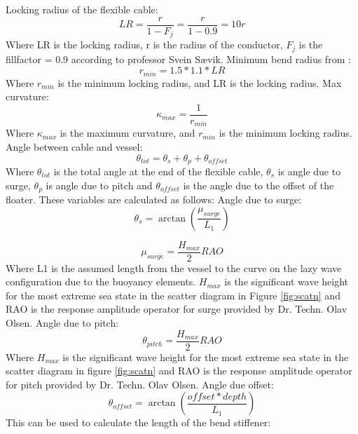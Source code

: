 \noindent Locking radius of the flexible cable:
\begin{equation}
    LR = \frac{r}{1-F_j} = \frac{r}{1-0.9} = 10r
\end{equation}
Where LR is the locking radius, r is the radius of the conductor, $F_j$ is the fillfactor = 0.9 according to professor Svein Sævik. \newline
\newline
Minimum bend radius from \cite{API2014}:
\begin{equation}
   r_{min}= 1.5 * 1.1 * LR
\end{equation}
Where $r_{min}$ is the minimum locking radius, and LR is the locking radius. 
\newline
\newline
Max curvature:
\begin{equation}
   \kappa_{max}= \frac{1}{r_{min}}
\end{equation}
Where $\kappa_{max}$ is the maximum curvature, and  $r_{min}$ is the minimum locking radius.
\newline
\newline
Angle between cable and vessel: 
\begin{equation}
   \theta_{tot} = \theta_{s} + \theta_{p} +   \theta_{offset}
\end{equation}
Where $\theta_{tot}$ is the total angle at the end of the flexible cable, $\theta_{s}$ is angle due to surge, $\theta_{p}$ is angle due to pitch and $\theta_{offset}$ is the angle due to the offset of the floater. These variables are calculated as follows:\newline
\newline 
Angle due to surge:
\begin{equation}
   \theta_{s} = \arctan{(\frac{\mu_{surge}}{L_{1}})}
\end{equation}

\begin{equation}
   \mu_{surge} = \frac{H_{max}}{2} RAO
\end{equation}
Where L{1} is the assumed length from the vessel to the curve on the lazy wave configuration due to the buoyancy elements.  $H_{max}$ is the significant wave height for the most extreme sea state in the scatter diagram in Figure \ref{fig:scatn} and RAO is the response amplitude operator for surge provided by Dr. Techn. Olav Olsen. \newline
\newline 
\noindent Angle due to pitch:
\begin{equation}
   \theta_{pitch} = \frac{H_{max}}{2} RAO
\end{equation}
Where $H_{max}$ is the significant wave height for the most extreme sea state in the scatter diagram in figure \ref{fig:scatn} and RAO is the response amplitude operator for pitch provided by Dr. Techn. Olav Olsen. \newline
\newline
Angle due offset:
\begin{equation}
   \theta_{offset} = \arctan{(\frac{offset * depth}{L_1})}
\end{equation}
This can be used to calculate the length of the bend stiffener:

